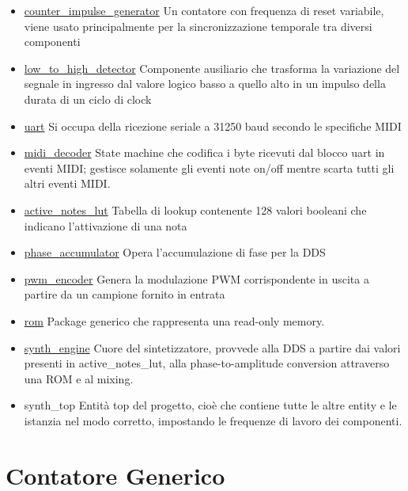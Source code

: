 \begin{itemize}
    \item \hyperref[sec:counter]{counter\_impulse\_generator} Un contatore con frequenza di reset variabile, viene
    usato principalmente per la sincronizzazione temporale tra diversi componenti
    \item \hyperref[sec:lowhigh]{low\_to\_high\_detector} Componente ausiliario che trasforma la variazione
    del segnale in ingresso dal valore logico basso a quello alto in un impulso della durata di un ciclo
    di clock
    \item \hyperref[sec:uart]{uart} Si occupa della ricezione seriale a 31250 baud secondo le specifiche MIDI
    \item \hyperref[sec:mididec]{midi\_decoder}  State machine che codifica i byte ricevuti dal blocco uart in eventi MIDI; gestisce solamente gli eventi note on/off
    mentre scarta tutti gli altri eventi MIDI.
    \item \hyperref[sec:noteslut]{active\_notes\_lut} Tabella di lookup contenente 128 valori booleani che indicano l'attivazione di una nota
    \item \hyperref[sec:phaseaccumulator]{phase\_accumulator} Opera l'accumulazione di fase per la DDS
    \item \hyperref[sec:pwmencoder]{pwm\_encoder} Genera la modulazione PWM corrispondente in uscita
    a partire da un campione fornito in entrata
    \item \hyperref[sec:rom]{rom} Package generico che rappresenta una read-only memory.
    \item \hyperref[sec:synthengine]{synth\_engine} Cuore del sintetizzatore, provvede alla DDS a partire dai valori presenti in active\_notes\_lut, alla phase-to-amplitude conversion attraverso una ROM e al mixing.
    \item synth\_top Entità top del progetto, cioè che contiene tutte le altre entity e le istanzia nel modo corretto, impostando le frequenze di lavoro dei componenti.
\end{itemize}

\section{Contatore Generico}
\label{sec:counter}

